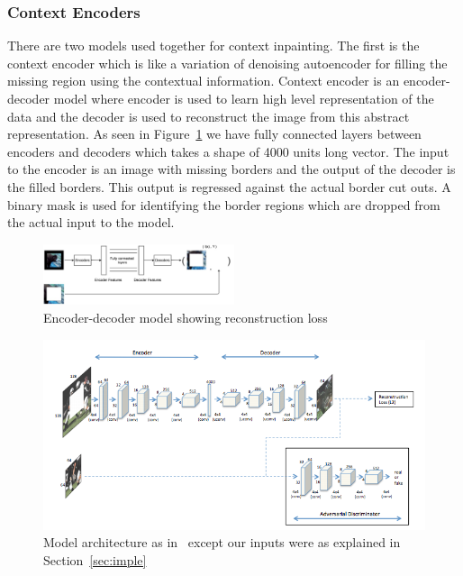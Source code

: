 \documentclass{sig-alternate}
\begin{document}
\subsubsection{Context Encoders}

There are two models used together for context inpainting. The first is the context encoder which is like a variation of denoising autoencoder for filling the missing region using the contextual information. Context encoder is an encoder-decoder model where encoder is used to learn high level representation of the data and the decoder is used to reconstruct the image from this abstract representation. As seen in Figure~\ref{fig:encoder} we have fully connected layers between encoders and decoders which takes a shape of 4000 units long vector. The input to the encoder is an image with missing borders and the output of the decoder is the filled borders. This output is regressed against the actual border cut outs. A binary mask is used for identifying the border regions which are dropped from the actual input to the model.

\begin{figure}[htb]
	\centering
	\includegraphics[width=0.5\textwidth]{encoder}
	\caption{Encoder-decoder model showing reconstruction loss}
	\label{fig:encoder}
\end{figure}

\begin{figure}
	\centering
	\includegraphics[width=16cm]{architecture}
	\caption{Model architecture as in~\cite{pathak2016context} except our inputs were as explained in Section~\ref{sec:imple}}
	\label{fig:archi}
\end{figure}
\end{document}
